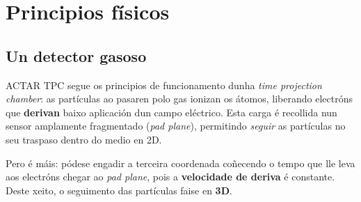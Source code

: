 \documentclass[11pt, a4paper]{article}
\begin{document}
\section{Principios físicos}
\subsection{Un detector gasoso}
ACTAR TPC segue os principios de funcionamento dunha \textit{time projection chamber}: as partículas ao pasaren polo gas ionizan os átomos, liberando electróns que \textbf{derivan} baixo aplicación dun campo eléctrico. Esta carga é recollida nun sensor amplamente fragmentado (\textit{pad plane}), permitindo \textit{seguir} as partículas no seu traspaso dentro do medio en 2D.

Pero é máis: pódese engadir a terceira coordenada coñecendo o tempo que lle leva aos electróns chegar ao \textit{pad plane}, pois a \textbf{velocidade de deriva} é constante. Deste xeito, o seguimento das partículas faise en \textbf{3D}.
\end{document}
